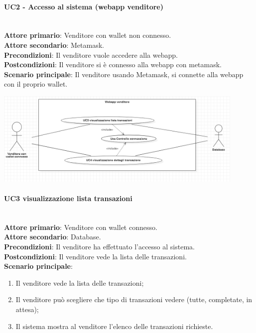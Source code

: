 \documentclass[a4paper, 12pt]{article}
\begin{document}
\paragraph{UC2 - Accesso al sistema (webapp venditore)}\\
\textbf{Attore primario}: Venditore con wallet non connesso.\\
\textbf{Attore secondario}: Metamask.\\
\textbf{Precondizioni}: Il venditore vuole accedere alla webapp.\\
\textbf{Postcondizioni}: Il venditore si è connesso alla webapp con metamask.\\
\textbf{Scenario principale}:
Il venditore usando Metamask, si connette alla webapp con il proprio wallet.

\includegraphics[width=0.9\textwidth]{UC_WAV3}

\paragraph{UC3 visualizzazione lista transazioni}\\
\textbf{Attore primario}: Venditore con wallet connesso. \\
\textbf{Attore secondario}: Database. \\
\textbf{Precondizioni}: Il venditore ha effettuato l'accesso al sistema.\\
\textbf{Postcondizioni}:  Il venditore vede la lista delle transazioni.\\
\textbf{Scenario principale}:
\begin{enumerate}
\item Il venditore vede la lista delle transazioni;
\item Il venditore può scegliere che tipo di transazioni vedere (tutte, completate, in attesa);
\item Il sistema mostra al venditore l'elenco delle transazioni richieste.
\end{enumerate}
\end{document}
